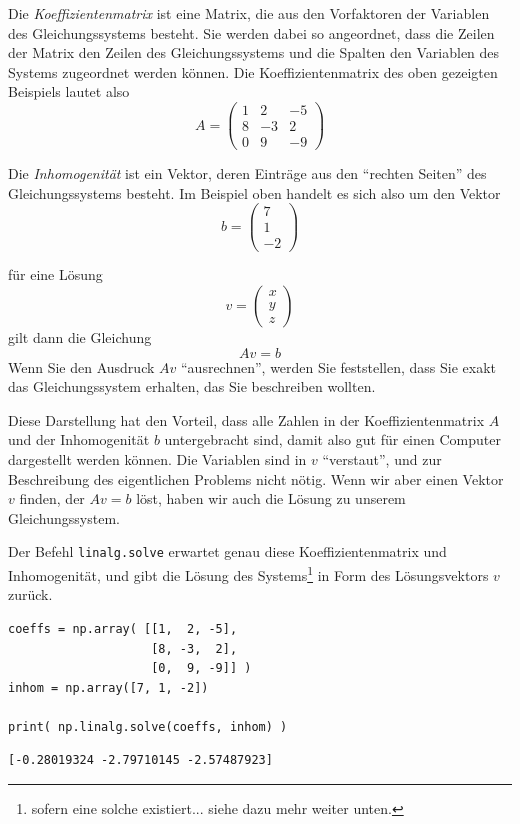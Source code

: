 \begin{hintbox}
Die \emph{Koeffizientenmatrix} ist eine Matrix, die aus den Vorfaktoren der Variablen des Gleichungssystems besteht. Sie werden dabei so angeordnet, dass die Zeilen der Matrix den Zeilen des Gleichungssystems und die Spalten den Variablen des Systems zugeordnet werden können. Die Koeffizientenmatrix des oben gezeigten Beispiels lautet also
\[ A = \begin{pmatrix}
	1 &  2 & -5 \\
	8 & -3 &  2 \\
	0 &  9 & -9
\end{pmatrix} \]
\end{hintbox}
%
\begin{hintbox}[]
Die \emph{Inhomogenität} ist ein Vektor, deren Einträge aus den \enquote{rechten Seiten} des Gleichungssystems besteht. Im Beispiel oben handelt es sich also um den Vektor
\[ b = \begin{pmatrix}
	7 \\ 1 \\ -2
\end{pmatrix} \]

für eine Lösung 
\[ v = \begin{pmatrix}
	x \\ y \\ z
\end{pmatrix} \]
gilt dann die Gleichung
\[ Av = b\]
Wenn Sie den Ausdruck $Av$ \enquote{ausrechnen}, werden Sie feststellen, dass Sie exakt das Gleichungssystem erhalten, das Sie beschreiben wollten.

Diese Darstellung hat den Vorteil, dass alle Zahlen in der Koeffizientenmatrix $A$ und der Inhomogenität $b$ untergebracht sind, damit also gut für einen Computer dargestellt werden können. Die Variablen sind in $v$ \enquote{verstaut}, und zur Beschreibung des eigentlichen Problems nicht nötig. Wenn wir aber einen Vektor $v$ finden, der $Av = b$ löst, haben wir auch die Lösung zu unserem Gleichungssystem.
\end{hintbox}

Der Befehl \texttt{linalg.solve} erwartet genau diese Koeffizientenmatrix und Inhomogenität, und gibt die Lösung des Systems\footnote{sofern eine solche existiert... siehe dazu mehr weiter unten.} in Form des Lösungsvektors $v$ zurück.

\begin{codebox}
\begin{verbatim}
coeffs = np.array( [[1,  2, -5],
                    [8, -3,  2],
                    [0,  9, -9]] )
inhom = np.array([7, 1, -2])

print( np.linalg.solve(coeffs, inhom) )
\end{verbatim}
\end{codebox}
%
\begin{cmdbox}
\begin{verbatim}
[-0.28019324 -2.79710145 -2.57487923]
\end{verbatim}
\end{cmdbox}

